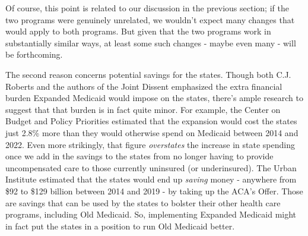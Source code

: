 \documentclass[
  11pt,
  letterpaper,
  DIV=11,
  numbers=noendperiod,
  oneside]{scrartcl}
\begin{document}
Of course, this point is related to our discussion in the previous
section; if the two programs were genuinely unrelated, we wouldn't
expect many changes that would apply to both programs. But given that
the two programs work in substantially similar ways, at least some such
changes - maybe even many - will be forthcoming.

The second reason concerns potential savings for the states. Though both
C.J. Roberts
and the authors of the Joint Dissent emphasized the extra financial burden Expanded
Medicaid would impose on the states, there's ample research to suggest
that that burden is in fact quite minor.
For example, the Center on Budget and Policy Priorities estimated that
the expansion would cost the states just 2.8\% more than they would
otherwise spend on Medicaid between 2014 and 2022. Even more strikingly, that figure
\emph{overstates} the increase in state spending once we add in the
savings to the states from no longer having to provide uncompensated
care to those currently uninsured (or underinsured). The Urban Institute
estimated that the states would end up \emph{saving} money - anywhere
from \$92 to \$129 billion between 2014 and 2019 - by taking up the
ACA's Offer. Those are
savings that can be used by the states to bolster their other health
care programs, including Old Medicaid. So, implementing Expanded
Medicaid might in fact put the states in a position to run Old Medicaid
better.
\end{document}
